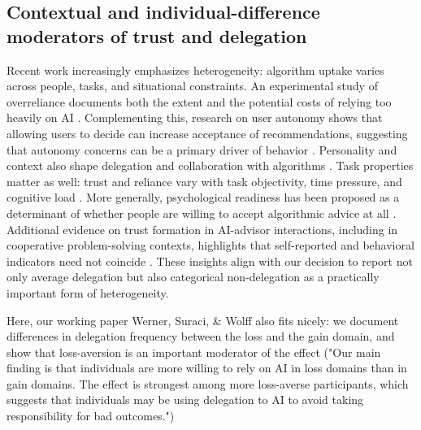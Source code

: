 \documentclass[a4paper, 12pt, fleqn]{article}
\theoremstyle{definition}
\begin{document}
\subsection{Contextual and individual-difference moderators of trust and delegation}
Recent work increasingly emphasizes heterogeneity: algorithm uptake varies across people, tasks, and situational constraints. An experimental study of overreliance documents both the extent and the potential costs of relying too heavily on AI \citep{Klingbeil2024}. Complementing this, research on user autonomy shows that allowing users to decide can increase acceptance of recommendations, suggesting that autonomy concerns can be a primary driver of behavior \citep{Fink2024}. Personality and context also shape delegation and collaboration with algorithms \citep{Ferraz2025}. Task properties matter as well: trust and reliance vary with task objectivity, time pressure, and cognitive load \citep{Yang2025}. More generally, psychological readiness has been proposed as a determinant of whether people are willing to accept algorithmic advice at all \citep{Kim2026}. Additional evidence on trust formation in AI-advisor interactions, including in cooperative problem-solving contexts, highlights that self-reported and behavioral indicators need not coincide \citep{Schreibelmayr2025}. These insights align with our decision to report not only average delegation but also categorical non-delegation as a practically important form of heterogeneity.
\begin{icomm}
	Here, our working paper Werner, Suraci, \& Wolff also fits nicely: we document differences in delegation frequency between the loss and the gain domain, and show that loss-aversion is an important moderator of the effect ("Our main finding is that individuals are more willing to rely on AI in loss
	domains than in gain domains. The effect is strongest among more loss-averse
	participants, which suggests that individuals may be using delegation to AI to
	avoid taking responsibility for bad outcomes.")
\end{icomm}
\end{document}
